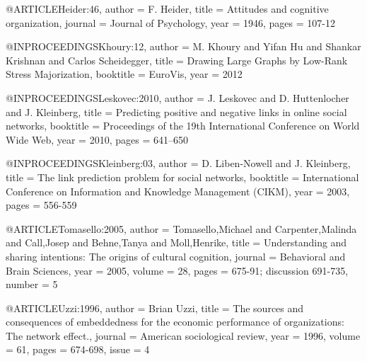 @ARTICLE{Heider:46,
  author = {F. Heider},
  title = {Attitudes and cognitive organization},
  journal = {Journal of Psychology},
  year = {1946},
  pages = {107-12}
}

@INPROCEEDINGS{Khoury:12,
  author = {M. Khoury and Yifan Hu and Shankar Krishnan and Carlos Scheidegger},
  title = {Drawing Large Graphs by Low-Rank Stress Majorization},
  booktitle = {EuroVis},
  year = {2012}
}

@INPROCEEDINGS{Leskovec:2010,
  author = {J. Leskovec and D. Huttenlocher and J. Kleinberg},
  title = {Predicting positive and negative links in online social networks},
  booktitle = {Proceedings of the 19th International Conference on World Wide Web},
  year = {2010},
  pages = {641--650}
}

@INPROCEEDINGS{Kleinberg:03,
  author = {D. Liben-Nowell and J. Kleinberg},
  title = {The link prediction problem for social networks},
  booktitle = {International Conference on Information and Knowledge Management
	(CIKM)},
  year = {2003},
  pages = {556-559}
}

@ARTICLE{Tomasello:2005,
  author = {Tomasello,Michael and Carpenter,Malinda and Call,Josep and Behne,Tanya
	and Moll,Henrike},
  title = {Understanding and sharing intentions: The origins of cultural cognition},
  journal = {Behavioral and Brain Sciences},
  year = {2005},
  volume = {28},
  pages = {675-91; discussion 691-735},
  number = {5}
}

@ARTICLE{Uzzi:1996,
  author = {Brian Uzzi},
  title = {The sources and consequences of embeddedness for the economic performance
	of organizations: The network effect.},
  journal = {American sociological review},
  year = {1996},
  volume = {61},
  pages = {674-698},
  issue = {4}
}




